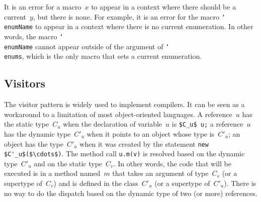 \documentclass{llncs}
\newcommand{\jmlCode}{\lstinline[style=jml,basicstyle=\normalsize]}
\newcommand{\macro}[1]{\texttt{\char`\\#1}}
\begin{document}
It is an error for a macro~$x$ to appear in a context where
there should be a current~$y$, but there is none. For example,
it is an error for the macro \macro{enumName} to appear in a
context where there is no current enumeration. In other words,
the macro \macro{enumName} cannot appear outside of the argument
of \macro{enums}, which is the only macro that sets a current
enumeration.


\subsection{Visitors}
\label{sec:visitors}

The visitor pattern is widely used to implement compilers. It can
be seen as a workaround to a limitation of most object-oriented
languages. A reference~$u$ has the static type~$C_u$ when the
declaration of variable~$u$ is \jmlCode|$C_u$ u;| a reference~$u$
has the dynamic type~$C'_u$ when it points to an object whose
type is~$C'_u$; an object has the type~$C'_u$ when it was created
by the statement \jmlCode|new $C'_u$($\cdots$)|. The method call
\jmlCode|u.m(v)| is resolved based on the dynamic type~$C'_u$
and on the static type~$C_v$. In other words, the code that will
be executed is in a method named~$m$ that takes an argument
of type~$C_v$ (or a supertype of~$C_v$) and is defined in the
class~$C'_u$ (or a supertype of~$C'_u$). There is no way to
do the dispatch based on the dynamic type of two (or more)
references.
\end{document}
